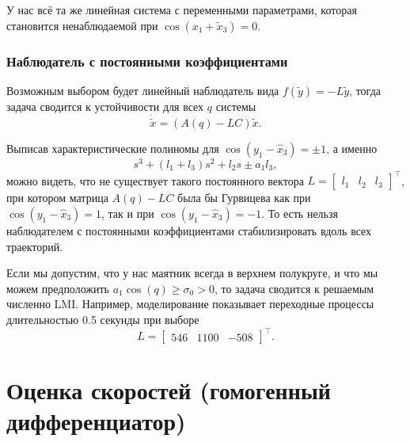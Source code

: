 \documentclass{article}
\begin{document}
У нас всё та же линейная система с переменными параметрами, которая становится ненаблюдаемой при $\cos(x_1+\tilde{x}_3) = 0$.

\subsubsection{Наблюдатель с постоянными коэффициентами}
Возможным выбором будет линейный наблюдатель вида $f(\tilde{y}) = -L\tilde{y}$, тогда задача сводится к устойчивости для всех $q$ системы 
\[
	\dot{\tilde{x}} = \left(A(q)-LC\right)\tilde{x}.
\]

Выписав характеристические полиномы для $\cos(y_1-\hat{x}_3)=\pm 1$,  а именно
\[
	s^3 + (l_1+l_3)s^2+l_2s \pm a_1l_3,
\]
можно видеть, что не существует такого постоянного вектора $L=\begin{bmatrix}l_1 & l_2 & l_3\end{bmatrix}^\top$, при котором матрица $A(q)-LC$ была бы Гурвицева как при $\cos(y_1-\hat{x}_3)=1$, так и при $\cos(y_1-\hat{x}_3)=-1$. То есть нельзя наблюдателем с постоянными коэффициентами стабилизировать вдоль всех траекторий. 


Если мы допустим, что у нас маятник всегда в верхнем полукруге, и что мы можем предположить $a_1\cos(q)\ge\sigma_0>0$, то задача сводится к решаемым численно LMI. Например, моделирование показывает переходные процессы длительностью 0.5 секунды при выборе 
\[
	L=\begin{bmatrix}546 & 1100 & -508\end{bmatrix}^\top.
\]


\section{Оценка скоростей (гомогенный дифференциатор)}
\end{document}
